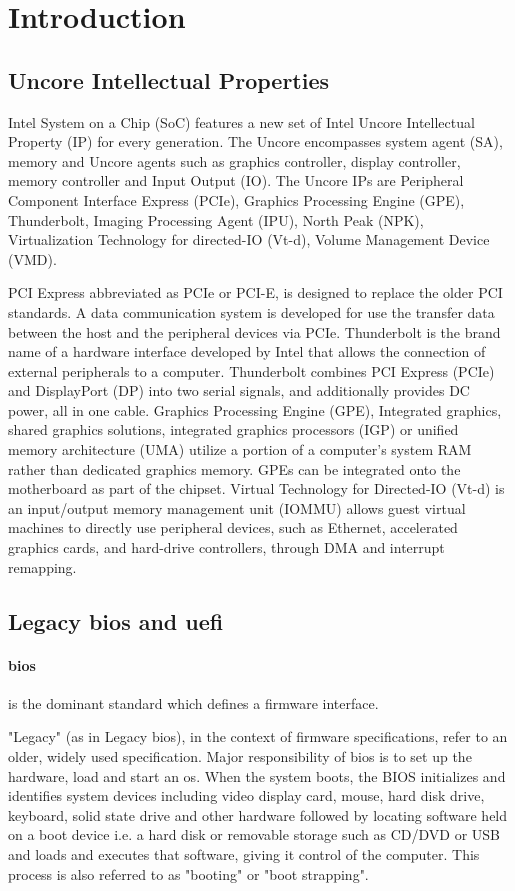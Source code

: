 \section{Introduction}
\subsection{Uncore Intellectual Properties}
Intel System on a Chip (SoC) features a new set of Intel Uncore Intellectual Property (IP)
for every generation. The Uncore encompasses system agent (SA), memory and Uncore agents
such as graphics controller, display controller, memory controller and Input Output (IO). The
Uncore IPs are Peripheral Component Interface Express (PCIe), Graphics Processing Engine
(GPE), Thunderbolt, Imaging Processing Agent (IPU), North Peak (NPK), Virtualization
Technology for directed-IO (Vt-d), Volume Management Device (VMD).

PCI Express abbreviated as PCIe or PCI-E, is designed to replace the older PCI standards.
A data communication system is developed for use the transfer data between the host and the
peripheral devices via PCIe. Thunderbolt is the brand name of a hardware interface developed
by Intel that allows the connection of external peripherals to a computer. Thunderbolt combines
PCI Express (PCIe) and DisplayPort (DP) into two serial signals, and additionally provides DC
power, all in one cable. Graphics Processing Engine (GPE), Integrated graphics, shared graphics
solutions, integrated graphics processors (IGP) or unified memory architecture (UMA) utilize a
portion of a computer's system RAM rather than dedicated graphics memory. GPEs can be
integrated onto the motherboard as part of the chipset. Virtual Technology for Directed-IO (Vt-d)
is an input/output memory management unit (IOMMU) allows guest virtual machines to directly
use peripheral devices, such as Ethernet, accelerated graphics cards, and hard-drive controllers,
through DMA and interrupt remapping.

\subsection{Legacy \gls{bios} and \gls{uefi}}

\paragraph{\gls{bios}} is the dominant standard which defines a firmware interface.

"Legacy" (as in Legacy \gls{bios}), in the context of firmware specifications, refer to an older, widely used specification. Major responsibility of \gls{bios} is to set up the hardware, load and start an \gls{os}. When the system boots, the BIOS initializes and identifies system devices including video display card, mouse, hard disk drive, keyboard, solid state drive and other hardware followed by locating software held on a boot device i.e. a hard disk or removable storage such as CD/DVD or USB and loads and executes that software, giving it control of the computer. This process is also referred to as "booting" or "boot strapping".


